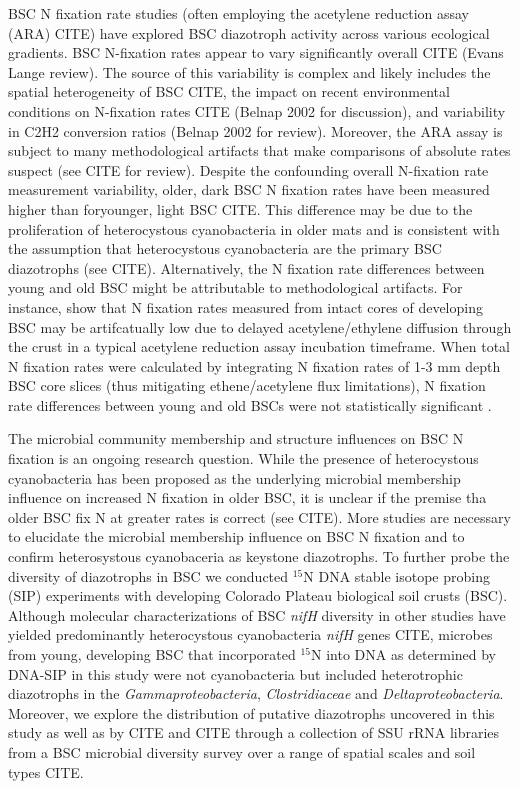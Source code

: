 BSC N fixation rate studies (often employing the acetylene reduction assay (ARA) CITE) have explored BSC diazotroph activity across various ecological gradients. BSC N-fixation rates appear to vary significantly overall CITE (Evans Lange review). The source of this variability is complex and likely includes the spatial heterogeneity of BSC CITE, the impact on recent environmental conditions on N-fixation rates CITE (Belnap 2002 for discussion), and variability in C2H2 conversion ratios (Belnap 2002 for review). Moreover, the ARA assay is subject to many methodological artifacts that make comparisons of absolute rates suspect (see CITE for review). Despite the confounding overall N-fixation rate measurement variability, older, dark BSC N fixation rates have been measured higher than foryounger, light BSC CITE. This difference may be due to the proliferation of heterocystous cyanobacteria in older mats and is consistent with the assumption that heterocystous cyanobacteria are the primary BSC diazotrophs (see CITE). Alternatively, the N fixation rate differences between young and old BSC might be attributable to methodological artifacts. For instance, \citet{15643930} show that N fixation rates measured from intact cores of developing BSC may be artifcatually low due to delayed acetylene/ethylene diffusion through the crust in a typical acetylene reduction assay incubation timeframe. When total N fixation rates were calculated by integrating N fixation rates of 1-3 mm depth BSC core slices (thus mitigating ethene/acetylene flux limitations), N fixation rate differences between young and old BSCs were not statistically significant \cite{15643930}.

The microbial community membership and structure influences on BSC N fixation is an ongoing research question. While the presence of heterocystous cyanobacteria has been proposed as the underlying microbial membership influence on increased N fixation in older BSC, it is unclear if the premise tha older BSC fix N at greater rates is correct (see CITE). More studies are necessary to elucidate the microbial membership influence on BSC N fixation and to confirm heterosystous cyanobaceria as keystone diazotrophs. To further probe the diversity of diazotrophs in BSC we conducted $^{15}$N DNA stable isotope probing (SIP) experiments with developing Colorado Plateau biological soil crusts (BSC). Although molecular characterizations of BSC \textit{nifH} diversity in other studies have yielded predominantly heterocystous cyanobacteria \textit{nifH} genes CITE, microbes from young, developing BSC that incorporated $^{15}$N into DNA as determined by DNA-SIP in this study were not cyanobacteria but included heterotrophic diazotrophs in the \textit{Gammaproteobacteria}, \textit{Clostridiaceae} and \textit{Deltaproteobacteria}. Moreover, we explore the distribution of putative diazotrophs uncovered in this study as well as by CITE and CITE through a collection of SSU rRNA libraries from a BSC microbial diversity survey over a range of spatial scales and soil types CITE.  